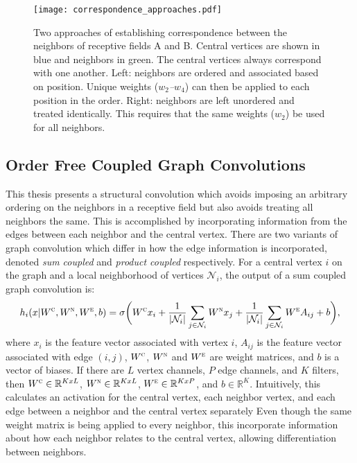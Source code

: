 \begin{figure}
	\centering
	\texttt{[image: correspondence\_approaches.pdf]}
	\caption{Two approaches of establishing correspondence between the neighbors of receptive fields A and B. Central vertices are shown in blue and neighbors in green. The central vertices always correspond with one another. Left: neighbors are ordered and associated based on position. Unique weights (\textit{$w_2$--$w_4$}) can then be applied to each position in the order. Right: neighbors are left unordered and treated identically. This requires that the same weights (\textit{$w_2$}) be used for all neighbors.}
	\label{fig:correspondence_approaches}
\end{figure}


\subsection{Order Free Coupled Graph Convolutions}
This thesis presents a structural convolution which avoids imposing an arbitrary ordering on the neighbors in a receptive field but also avoids treating all neighbors the same.
This is accomplished by incorporating information from the edges between each neighbor and the central vertex.
There are two variants of graph convolution which differ in how the edge information is incorporated, denoted \textit{sum coupled} and \textit{product coupled} respectively.
For a central vertex $i$ on the graph and a local neighborhood of vertices $\mathcal{N}_i$, the output of a sum coupled graph convolution is:
\begin{equation}
h_i(x | W^\textsc{c}, W^\textsc{n}, W^\textsc{e}, b) = \sigma \bigg( W^{\textsc{c}} x_i + \frac{1}{|\mathcal{N}_i|}\sum_{j \in \mathcal{N}_i} W^{\textsc{n}} x_j + \frac{1}{|\mathcal{N}_i|}\sum_{j \in \mathcal{N}_i} W^{\textsc{e}} A_{ij} + b \bigg),
\label{eq:sum_coupling}
\end{equation}
where $x_i$ is the feature vector associated with vertex $i$, $A_{ij}$ is the feature vector associated with edge $(i, j)$, $W^\textsc{c}$, $W^\textsc{n}$ and $W^\textsc{e}$ are weight matrices, and $b$ is a vector of biases. 
If there are $L$ vertex channels, $P$ edge channels, and $K$ filters, then $W^\textsc{c}\in\mathbb{R}^{KxL}$, $W^\textsc{n}\in\mathbb{R}^{KxL}$, $W^\textsc{e}\in\mathbb{R}^{KxP}$, and $b\in\mathbb{R}^{K}$.
Intuitively, this calculates an activation for the central vertex, each neighbor vertex, and each edge between a neighbor and the central vertex separately
Even though the same weight matrix is being applied to every neighbor, this incorporate information about how each neighbor relates to the central vertex, allowing differentiation between neighbors.

